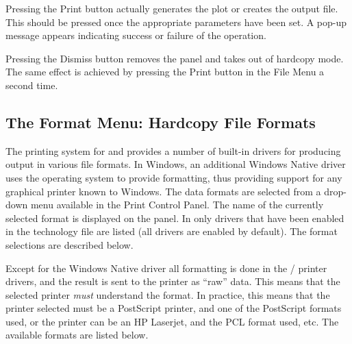 Pressing the {\cb Print} button actually generates the plot or creates
the output file.  This should be pressed once the appropriate
parameters have been set.  A pop-up message appears indicating success
or failure of the operation.

Pressing the {\cb Dismiss} button removes the panel and takes {\Xic}
out of hardcopy mode.  The same effect is achieved by
pressing the {\cb Print} button in the {\cb File Menu} a second time. 


\subsection{The {\cb Format} Menu: Hardcopy File Formats}
\label{hcformat}

The printing system for {\Xic} and {\WRspice} provides a number of
built-in drivers for producing output in various file formats.  In
Windows, an additional {\et Windows Native} driver uses the operating
system to provide formatting, thus providing support for any graphical
printer known to Windows.  The data formats are selected from a
drop-down menu available in the {\cb Print Control Panel}.  The name
of the currently selected format is displayed on the panel.  In {\Xic}
only drivers that have been enabled in the technology file are listed
(all drivers are enabled by default).  The format selections are
described below.

Except for the {\et Windows Native} driver all formatting is done in the
{\Xic}/{\WRspice} printer drivers, and the result is sent to the
printer as ``raw'' data.  This means that the selected printer {\it
must} understand the format.  In practice, this means that the printer
selected must be a PostScript printer, and one of the PostScript
formats used, or the printer can be an HP Laserjet, and the PCL format
used, etc.  The available formats are listed below.

